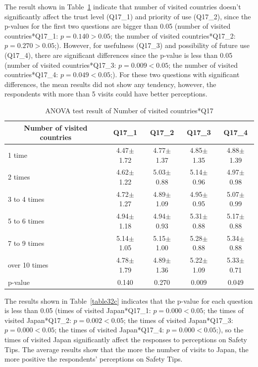 The result shown in Table~\ref{table32b} indicate that number of visited countries doesn't significantly affect the trust level (Q17\_1) and priority of use (Q17\_2), since the p-values for the first two questions are bigger than 0.05 (number of visited countries*Q17\_1: $p=0.140>0.05$; the number of visited countries*Q17\_2: $p=0.270>0.05$;). However, for usefulness (Q17\_3) and possibility of future use (Q17\_4), there are significant differences since the p-value is less than 0.05 (number of visited countries*Q17\_3: $p=0.009<0.05$; the number of visited countries*Q17\_4: $p=0.049<0.05$;). For these two questions with significant differences, the mean results did not show any tendency, however, the respondents with more than 5 visits could have better perceptions. 


\begin{table}[h]
  \caption{ANOVA test result of Number of visited countries*Q17}
  \label{table32b}
  \centering
  \begin{tabular}{l|cccc}
 \hline
        \multicolumn{1}{c|}{Number of visited countries}          & Q17\_1               & Q17\_2 & Q17\_3    & Q17\_4       \\
\hline
1 time        & 4.47$\pm$1.72           & 4.77$\pm$1.37  & 4.85$\pm$1.35 & 4.88$\pm$1.39  \\
2 times       & 4.62$\pm$1.22 & 5.03$\pm$0.88 & 5.14$\pm$0.96 & 4.97$\pm$0.98  \\
3 to 4 times  & 4.72$\pm$1.27 & 4.89$\pm$1.09 & 4.95$\pm$0.95& 5.07$\pm$0.99 \\
5 to 6 times  & 4.94$\pm$1.18 & 4.94$\pm$0.93& 5.31$\pm$0.88 & 5.17$\pm$0.88 \\
7 to 9 times  & 5.14$\pm$1.05 & 5.15$\pm$1.00 & 5.28$\pm$0.88 & 5.34$\pm$0.88 \\
over 10 times & 4.78$\pm$1.79& 4.89$\pm$1.36 & 5.22$\pm$1.09 & 5.33$\pm$0.71\\
\hline
p-value&           0.140&         0.270&         0.009&   0.049     \\
 \hline
  \end{tabular}
\end{table}



The results shown in Table~\ref{table32c} indicates that the p-value for each question is less than 0.05 (times of visited Japan*Q17\_1: $p=0.000<0.05$; the times of visited Japan*Q17\_2: $p=0.002<0.05$; the times of visited Japan*Q17\_3: $p=0.000<0.05$; the times of visited Japan*Q17\_4: $p=0.000<0.05$;), so the times of visited Japan significantly affect the responses to perceptions on Safety Tips. The average results show that the more the number of visits to Japan, the more positive the respondents' perceptions on Safety Tips. 


